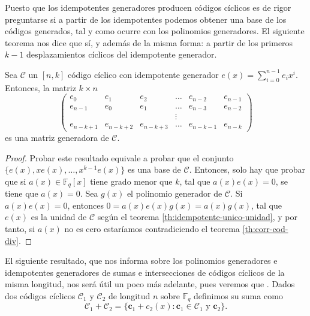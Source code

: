 Puesto que los idempotentes generadores producen códigos cíclicos es de rigor preguntarse si a partir de los idempotentes podemos obtener una base de los códigos generados, tal y como ocurre con los polinomios generadores.
El siguiente teorema nos dice que sí, y además de la misma forma: a partir de los primeros \(k - 1\) desplazamientos cíclicos del idempotente generador.

\begin{theorem}
  Sea \(\mathcal C\) un \([n, k]\) código cíclico con idempotente generador \(e(x) = \sum_{i=0}^{n-1}e_ix^i\).
  Entonces, la matriz \(k \times n\)
  \[
    \begin{pmatrix*}
      e_0 & e_1 & e_2 & \dots & e_{n-2} & e_{n-1} \\
      e_{n-1} & e_0 & e_1 & \dots & e_{n-3} & e_{n-2} \\
       & & & \vdots & & \\
      e_{n-k+1} & e_{n-k+2} & e_{n-k+3} & \dots & e_{n-k-1} & e_{n-k}
    \end{pmatrix*}
  \] es una matriz generadora de \(\mathcal C\).
\end{theorem}

\begin{proof}
  Probar este resultado equivale a probar que el conjunto \(\{e(x), xe(x), \dots, x^{k-1}e(x)\}\) es una base de \(\mathcal C\).
  Entonces, solo hay que probar que si \(a(x) \in \mathbb F_q[x]\) tiene grado menor que \(k\), tal que \(a(x)e(x) = 0\), se tiene que \(a(x) = 0\).
  Sea \(g(x)\) el polinomio generador de \(\mathcal C\).
  Si \(a(x)e(x) = 0\), entonces \(0 = a(x)e(x)g(x) = a(x)g(x)\), tal que \(e(x)\) es la unidad de \(\mathcal C\) según el teorema \ref{th:idempotente-unico-unidad}, y por tanto, si \(a(x)\) no es cero estaríamos contradiciendo el teorema \ref{th:corr-cod-div}.
\end{proof}

El siguiente resultado, que nos informa sobre los polinomios generadores e idempotentes generadores de sumas e intersecciones de códigos cíclicos de la misma longitud, nos será útil un poco más adelante, pues veremos que .
Dados dos códigos cíclicos \(\mathcal C_1\) y \(\mathcal C_2\) de longitud \(n\) sobre \(\mathbb F_q\) definimos su suma como
\[
  \mathcal C_1 + \mathcal C_2 = \{\mathbf{c}_1 + c_2(x) : \mathbf{c}_1 \in \mathcal C_1 \text{ y } \mathbf{c}_2\}.
\]

